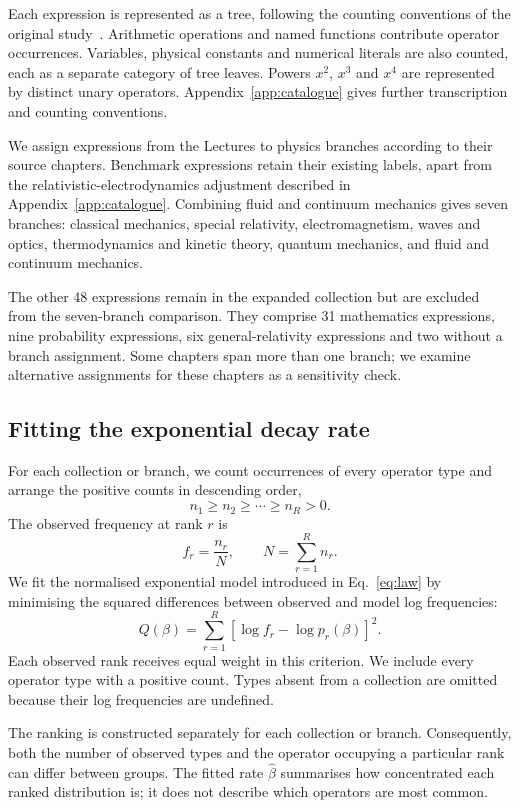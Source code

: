 \documentclass[10pt]{article}
\begin{document}
Each expression is represented as a tree, following the counting conventions of the original study~\citep{constantin2024}. Arithmetic operations and named functions contribute operator occurrences. Variables, physical constants and numerical literals are also counted, each as a separate category of tree leaves. Powers $x^2$, $x^3$ and $x^4$ are represented by distinct unary operators. Appendix~\ref{app:catalogue} gives further transcription and counting conventions.

We assign expressions from the Lectures to physics branches according to their source chapters. Benchmark expressions retain their existing labels, apart from the relativistic-electrodynamics adjustment described in Appendix~\ref{app:catalogue}. Combining fluid and continuum mechanics gives seven branches: classical mechanics, special relativity, electromagnetism, waves and optics, thermodynamics and kinetic theory, quantum mechanics, and fluid and continuum mechanics.

The other 48 expressions remain in the expanded collection but are excluded from the seven-branch comparison. They comprise 31 mathematics expressions, nine probability expressions, six general-relativity expressions and two without a branch assignment. Some chapters span more than one branch; we examine alternative assignments for these chapters as a sensitivity check.

\subsection{Fitting the exponential decay rate}\label{sec:methods}
For each collection or branch, we count occurrences of every operator type and arrange the positive counts in descending order,
\[
n_1\geq n_2\geq\cdots\geq n_R>0.
\]
The observed frequency at rank $r$ is
\[
f_r=\frac{n_r}{N},
\qquad N=\sum_{r=1}^{R}n_r.
\]
We fit the normalised exponential model introduced in Eq.~\eqref{eq:law} by minimising the squared differences between observed and model log frequencies:
\begin{equation}
Q(\beta)=\sum_{r=1}^{R}\left[\log f_r-\log p_r(\beta)\right]^2.
\label{eq:logls}
\end{equation}
Each observed rank receives equal weight in this criterion. We include every operator type with a positive count. Types absent from a collection are omitted because their log frequencies are undefined.

The ranking is constructed separately for each collection or branch. Consequently, both the number of observed types and the operator occupying a particular rank can differ between groups. The fitted rate $\hat\beta$ summarises how concentrated each ranked distribution is; it does not describe which operators are most common.
\end{document}
